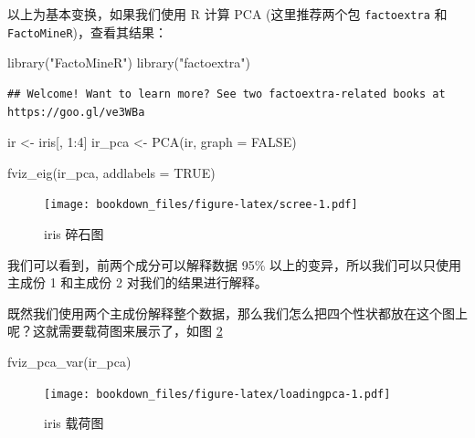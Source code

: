 \documentclass[
]{krantz}
\makeatletter
\newenvironment{Shaded}{\begin{snugshade}}{\end{snugshade}}
\newcommand{\AttributeTok}[1]{\textcolor[rgb]{0.77,0.63,0.00}{#1}}
\newcommand{\ConstantTok}[1]{\textcolor[rgb]{0.00,0.00,0.00}{#1}}
\newcommand{\DecValTok}[1]{\textcolor[rgb]{0.00,0.00,0.81}{#1}}
\newcommand{\FunctionTok}[1]{\textcolor[rgb]{0.00,0.00,0.00}{#1}}
\newcommand{\NormalTok}[1]{#1}
\newcommand{\OtherTok}[1]{\textcolor[rgb]{0.56,0.35,0.01}{#1}}
\newcommand{\SpecialCharTok}[1]{\textcolor[rgb]{0.00,0.00,0.00}{#1}}
\newcommand{\StringTok}[1]{\textcolor[rgb]{0.31,0.60,0.02}{#1}}
\newenvironment{kframe}{%
\medskip{}
\setlength{\fboxsep}{.8em}
 \def\at@end@of@kframe{}%
 \ifinner\ifhmode%
  \def\at@end@of@kframe{\end{minipage}}%
  \begin{minipage}{\columnwidth}%
 \fi\fi%
 \def\FrameCommand##1{\hskip\@totalleftmargin \hskip-\fboxsep
 \colorbox{shadecolor}{##1}\hskip-\fboxsep
     \hskip-\linewidth \hskip-\@totalleftmargin \hskip\columnwidth}%
 \MakeFramed {\advance\hsize-\width
   \@totalleftmargin\z@ \linewidth\hsize
   \@setminipage}}%
 {\par\unskip\endMakeFramed%
 \at@end@of@kframe}
\renewenvironment{Shaded}{\begin{kframe}}{\end{kframe}}
\makeatother
\begin{document}
以上为基本变换，如果我们使用 R 计算 PCA (这里推荐两个包 \texttt{factoextra} 和 \texttt{FactoMineR})，查看其结果：

\begin{Shaded}
\begin{Highlighting}[]
\FunctionTok{library}\NormalTok{(}\StringTok{"FactoMineR"}\NormalTok{)}
\FunctionTok{library}\NormalTok{(}\StringTok{"factoextra"}\NormalTok{)}
\end{Highlighting}
\end{Shaded}

\begin{verbatim}
## Welcome! Want to learn more? See two factoextra-related books at https://goo.gl/ve3WBa
\end{verbatim}

\begin{Shaded}
\begin{Highlighting}[]
\NormalTok{ir }\OtherTok{\textless{}{-}}\NormalTok{ iris[, }\DecValTok{1}\SpecialCharTok{:}\DecValTok{4}\NormalTok{]}
\NormalTok{ir\_pca }\OtherTok{\textless{}{-}} \FunctionTok{PCA}\NormalTok{(ir, }\AttributeTok{graph =} \ConstantTok{FALSE}\NormalTok{)}

\FunctionTok{fviz\_eig}\NormalTok{(ir\_pca, }\AttributeTok{addlabels =} \ConstantTok{TRUE}\NormalTok{)}
\end{Highlighting}
\end{Shaded}

\begin{figure}
\centering
\texttt{[image: bookdown\_files/figure-latex/scree-1.pdf]}
\caption{\label{fig:scree}iris 碎石图}
\end{figure}

我们可以看到，前两个成分可以解释数据 95\% 以上的变异，所以我们可以只使用主成份 1 和主成份 2 对我们的结果进行解释。

既然我们使用两个主成份解释整个数据，那么我们怎么把四个性状都放在这个图上呢？这就需要载荷图来展示了，如图 \ref{fig:loadingpca}

\begin{Shaded}
\begin{Highlighting}[]
\FunctionTok{fviz\_pca\_var}\NormalTok{(ir\_pca)}
\end{Highlighting}
\end{Shaded}

\begin{figure}
\centering
\texttt{[image: bookdown\_files/figure-latex/loadingpca-1.pdf]}
\caption{\label{fig:loadingpca}iris 载荷图}
\end{figure}
\end{document}
